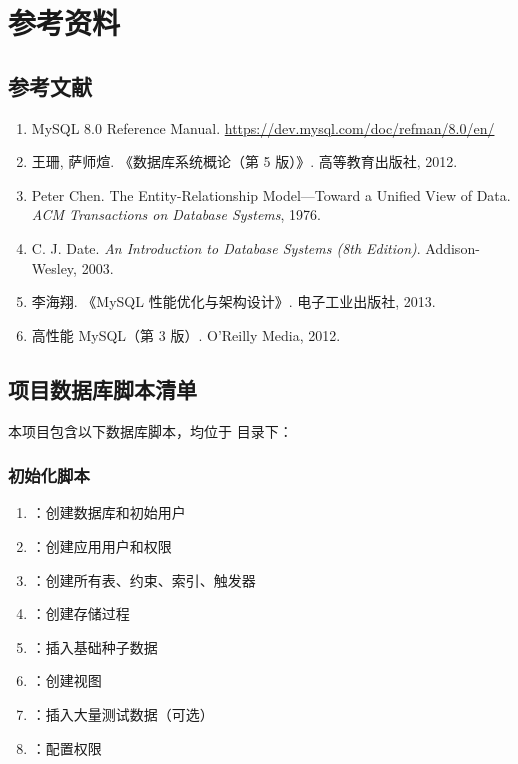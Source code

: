 \chapter{参考资料}

\section{参考文献}

\begin{enumerate}
  \item MySQL 8.0 Reference Manual. \url{https://dev.mysql.com/doc/refman/8.0/en/}

  \item 王珊, 萨师煊. 《数据库系统概论（第 5 版）》. 高等教育出版社, 2012.

  \item Peter Chen. The Entity-Relationship Model—Toward a Unified View of Data. \textit{ACM Transactions on Database Systems}, 1976.

  \item C. J. Date. \textit{An Introduction to Database Systems (8th Edition)}. Addison-Wesley, 2003.

  \item 李海翔. 《MySQL 性能优化与架构设计》. 电子工业出版社, 2013.

  \item 高性能 MySQL（第 3 版）. O'Reilly Media, 2012.
\end{enumerate}

\section{项目数据库脚本清单}

本项目包含以下数据库脚本，均位于  目录下：

\subsection{初始化脚本}

\begin{enumerate}
  \item {}：创建数据库和初始用户
  \item {}：创建应用用户和权限
  \item {}：创建所有表、约束、索引、触发器
  \item {}：创建存储过程
  \item {}：插入基础种子数据
  \item {}：创建视图
  \item {}：插入大量测试数据（可选）
  \item {}：配置权限
\end{enumerate}

